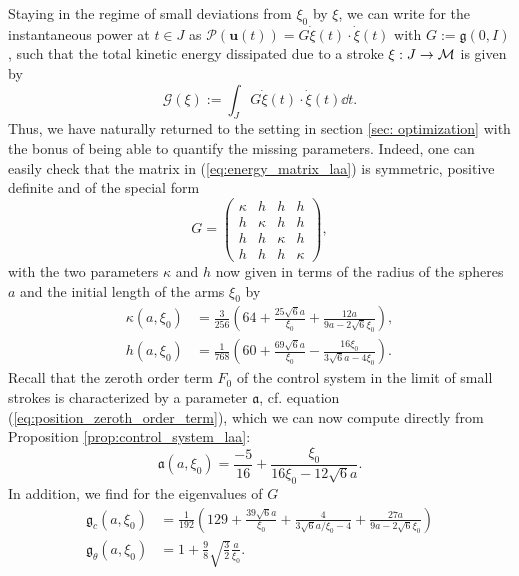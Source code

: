Staying in the regime of small deviations from $\xi_0$ by $\xi$, we can write for the instantaneous power at $t \in J$ as $\mathcal{P}(\boldsymbol u(t)) = G \dot{\xi}(t) \cdot \dot{\xi}(t)$ with $G := \mathfrak{g}(0, I)$, such that the total kinetic energy dissipated due to a stroke $\xi: J \to \mathcal{M}$ is given by
\begin{equation}
	\mathcal{G}(\xi) := \int_{J} G \dot{\xi}(t) \cdot \dot{\xi}(t) \dd t.
\end{equation}
Thus, we have naturally returned to the setting in section \ref{sec: optimization} with the bonus of being able to quantify the missing parameters. Indeed, one can easily check that the matrix in (\ref{eq:energy_matrix_laa}) is symmetric, positive definite and of the special form
\begin{equation}
G = \left ( \begin{array}{cccc}
\kappa & h & h & h \\ 
h & \kappa & h & h \\ 
h & h & \kappa & h \\ 
h & h & h & \kappa
\end{array} \right ),
\end{equation}
with the two parameters $\kappa$ and $h$ now given in terms of the radius of the spheres $a$ and the initial length of the arms $\xi_0$ by
\begin{eqnarray}
\kappa(a, \xi_0) &= \frac{3}{256} \left ( 64 + \frac{25 \sqrt{6} a}{\xi_0} + \frac{12 a}{9 a - 2 \sqrt{6} \xi_0} \right ),\\
h(a, \xi_0)  &= \frac{1}{768} \left (60 + \frac{69 \sqrt{6} a}{\xi_0} - \frac{16 \xi_0}{3 \sqrt{6} a - 4 \xi_0}  \right ).
\end{eqnarray}
Recall that the zeroth order term $F_0$ of the control system in the limit of small strokes is characterized by a parameter $\mathfrak{a}$, cf. equation (\ref{eq:position_zeroth_order_term}), which we can now compute directly from Proposition \ref{prop:control_system_laa}:
\begin{equation}
\mathfrak{a}(a, \xi_0) = \frac{-5}{16} + \frac{\xi_0}{16 \xi_0 - 12 \sqrt{6} a}.
\end{equation}
In addition, we find for the eigenvalues of $G$
\begin{align}
	\mathfrak{g}_c(a, \xi_0) &= \frac{1}{192} \left  (129 + \frac{39 \sqrt{6} a}{\xi_0} + \frac{4}{3 \sqrt{6} a/\xi_0 - 4} + \frac{27 a}{9a - 2 \sqrt{6} \xi_0} \right )\\
	\mathfrak{g}_{\theta}(a, \xi_0) &= 1 + \frac{9}{8} \sqrt{\frac{3}{2}} \frac{a}{\xi_0}.
\end{align}


